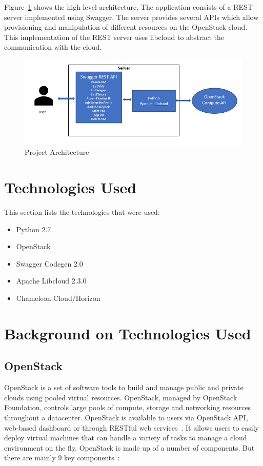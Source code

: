 Figure~\ref{fig:project-architecture} shows the high level architecture. The 
application consists of a REST server implemented using Swagger. The server
provides several APIs which allow provisioning and manipulation of different
resources on the OpenStack cloud. This implementation of the REST server uses 
libcloud to abstract the communication with the cloud. 

\begin{figure}[!ht]
        \centering\includegraphics[width=\columnwidth]
        {images/proj-architecture.PNG}
        \caption{Project Architecture}\label{fig:project-architecture}
\end{figure}

\section{Technologies Used}
This section lists the technologies that were used:
\begin{itemize}
\item Python 2.7
\item OpenStack 
\item Swagger Codegen 2.0
\item Apache Libcloud 2.3.0
\item Chameleon Cloud/Horizon
\end{itemize}

\section{Background on Technologies Used}

\subsection{OpenStack}
OpenStack is a set of software tools to build and manage public and private
clouds using pooled virtual resources. OpenStack, managed by OpenStack
Foundation, controls large pools of compute, storage and networking resources
throughout a datacenter. OpenStack is available to users via OpenStack API,
web-based dashboard or through RESTful web
services~\cite{hid-sp18-516-www-wiki-openstack}. It allows users to easily 
deploy virtual machines that can handle a variety of tasks to manage a cloud
environment on the fly. OpenStack is made up of a number of components. But
there are mainly 9 key components~\cite{hid-sp18-516-www-opensource}:

